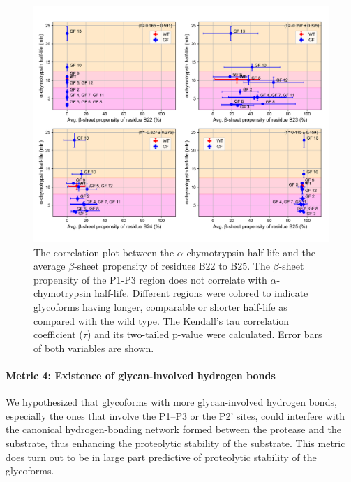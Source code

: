 \documentclass[9pt]{elife}
\begin{document}
\begin{figure}[H]
\centering
\includegraphics[width=\textwidth]{Figures/avg_beta_propensity_correlation.png}
\caption{The correlation plot between the $\alpha$-chymotrypsin half-life and the average $\beta$-sheet propensity of residues B22 to B25. The $\beta$-sheet propensity of the P1-P3 region does not correlate with $\alpha$-chymotrypsin half-life. Different regions were colored to indicate glycoforms having longer, comparable or shorter half-life as compared with the wild type. The Kendall's tau correlation coefficient ($\tau$) and its two-tailed p-value were calculated. Error bars of both variables are shown.}
\label{result_beta}
\end{figure}

\paragraph{Metric 4: Existence of glycan-involved hydrogen bonds}
We hypothesized that glycoforms with more glycan-involved hydrogen bonds, especially the ones that involve the P1--P3 or the P2' sites, could interfere with the canonical hydrogen-bonding network formed between the protease and the substrate, thus enhancing the proteolytic stability of the substrate. This metric does turn out to be in large part predictive of proteolytic stability of the glycoforms. 
\end{document}
